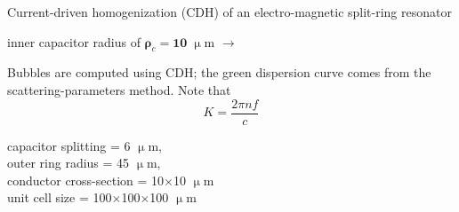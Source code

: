 \documentclass[t]{beamer} \usepackage[english]{babel} \usepackage[utf8]{inputenc} \usetheme{Frankfurt} %
\begin{document}
\begin{frame}[plain]{}%
\begin{columns}[T] %
	\begin{column}{.55\textwidth}
	\vspace{3mm}
	\noindent Current-driven homogenization (CDH) of an electro-magnetic split-ring resonator 
	\begin{exampleblock}\hfill inner capacitor radius of $\pmb\rho_c=\pmb{10}\;\upmu$m $\rightarrow$\end{exampleblock}
	\vspace{3mm}

	\noindent Bubbles are computed using CDH; the green dispersion curve comes from the scattering-parameters method. Note that $$K = \frac{2\pi n f}{c}$$
	\vspace{12mm}

	\small{capacitor splitting = 6 $\upmu$m,\\ outer ring radius = 45 $\upmu$m,\\ conductor cross-section = 10$\times$10 $\upmu$m\\ unit cell size = 100$\times$100$\times$100 $\upmu$m}
	\vspace{5mm}


\end{column}
\end{columns}
\end{frame}
\end{document}
